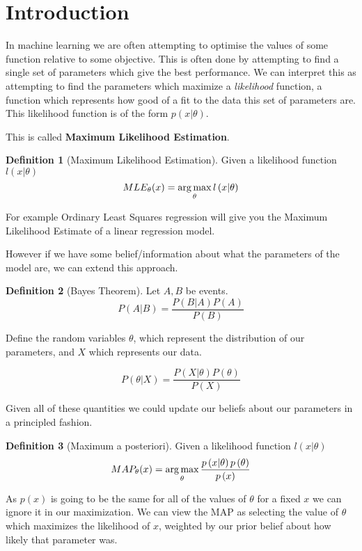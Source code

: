 \documentclass[12pt, a4paper]{report}
\theoremstyle{definition}
\theoremstyle{definition}
\newtheorem{definition}{Definition}[section]
\theoremstyle{definition}
\begin{document}
\section{Introduction}

In machine learning we are often attempting to optimise the values of some function relative to some objective. This is often done by attempting to find a single set of parameters which give the best performance. We can interpret this as attempting to find the parameters which maximize a \textit{likelihood} function, a function which represents how good of a fit to the data this set of parameters are. This likelihood function is of the form $p(x | \theta)$.


This is called \textbf{Maximum Likelihood Estimation}.

\begin{definition}[Maximum Likelihood Estimation]
    Given a likelihood function $l(x | \theta)$
$$MLE_{\theta}(x) = \operatorname*{arg\,max}_{\theta} l\left(x | \theta\right)$$
\end{definition}

For example Ordinary Least Squares regression will give you the Maximum Likelihood Estimate of a linear regression model.

However if we have some belief/information about what the parameters of the model are, we can extend this approach.

\begin{definition}[Bayes Theorem]
    Let $A,B$ be events.
$$P \left( A | B\right) = \frac{P \left( B | A\right) P \left(A\right)}{P \left(B \right)}$$
\end{definition}


Define the random variables $\theta$, which represent the distribution of our parameters, and $X$ which represents our data.

$$P \left( \theta | X\right) = \frac{P \left( X | \theta \right) P \left( \theta\right)}{P \left( X  \right)}$$

Given all of these quantities we could update our beliefs about our parameters in a principled fashion.


\begin{definition}[Maximum a posteriori]
    Given a likelihood function $l(x | \theta)$
$$MAP_{\theta}(x) = \operatorname*{arg\,max}_{\theta}  \frac{p \left( x | \theta \right) p \left( \theta\right)}{p \left( x  \right)}$$
\end{definition}

As $p(x)$ is going to be the same for all of the values of $\theta$ for a fixed $x$ we can ignore it in our maximization. We can view the MAP as selecting the value of $\theta$ which maximizes the likelihood of $x$, weighted by our prior belief about how likely that parameter was.
\end{document}
